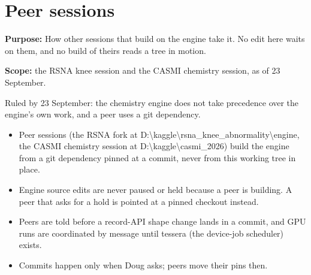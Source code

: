 \chapter{\texorpdfstring{Peer sessions}{Peer sessions}}
\label{chap:peer-sessions}

\textbf{Purpose:} How other sessions that build on the engine take it. No edit here waits on them, and no build of theirs reads a tree in motion.

\textbf{Scope:} the RSNA knee session and the CASMI chemistry session, as of 23 September.

Ruled by 23 September: the chemistry engine does not take precedence over the engine's own work, and a peer uses a git dependency.

\begin{itemize}
\item Peer sessions (the RSNA fork at D:\textbackslash{}kaggle\textbackslash{}rsna\_\allowbreak{}knee\_\allowbreak{}abnormality\textbackslash{}engine, the CASMI chemistry session at D:\textbackslash{}kaggle\textbackslash{}casmi\_\allowbreak{}2026) build the engine from a git dependency pinned at a commit, never from this working tree in place.
\item Engine source edits are never paused or held because a peer is building. A peer that asks for a hold is pointed at a pinned checkout instead.
\item Peers are told before a record-API shape change lands in a commit, and GPU runs are coordinated by message until tessera (the device-job scheduler) exists.
\item Commits happen only when Doug asks; peers move their pins then.
\end{itemize}
